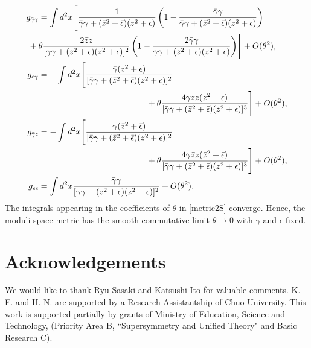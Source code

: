 \documentclass[a4paper,12pt]{article}
\begin{document}
\begin{subequations}\label{metric2S}
\begin{align}
g_{\bar{\gamma}\gamma}&=\int d^2x\Biggl[\frac{1}{\bar{\gamma}\gamma+(\bar{z}^2+\bar{\epsilon})(z^2+\epsilon)}
\left(1-\frac{\bar{\gamma}\gamma}{\bar{\gamma}\gamma+(\bar{z}^2+\bar{\epsilon})(z^2+\epsilon)}\right)\notag\\
{}+{}&\theta\frac{2\bar{z}z}{[\bar{\gamma}\gamma+(\bar{z}^2+\bar{\epsilon})(z^2+\epsilon)]^2}\left(1
-\frac{2\bar{\gamma}\gamma}{\bar{\gamma}\gamma+(\bar{z}^2+\bar{\epsilon})(z^2+\epsilon)}\right)\Biggr]+O(\theta^2),\\
g_{\bar{\epsilon}\gamma}&=-\int d^2x\Biggl[\frac{\bar{\gamma}(z^2+\epsilon)}{[\bar{\gamma}\gamma+(\bar{z}^2
+\bar{\epsilon})(z^2+\epsilon)]^2}\notag\\ &\hspace{4.5cm}
+\theta\frac{4\bar{\gamma}\bar{z}z(z^2+\epsilon)}{[\bar{\gamma}\gamma
+(\bar{z}^2+\bar{\epsilon})(z^2+\epsilon)]^3}\Biggr]+O(\theta^2),\\
g_{\bar{\gamma}\epsilon}&=-\int d^2x\Biggl[\frac{\gamma(\bar{z}^2+\bar{\epsilon})}{[\bar{\gamma}\gamma+(\bar{z}^2
+\bar{\epsilon})(z^2+\epsilon)]^2}\notag\\ &\hspace{4.5cm}
+\theta\frac{4\gamma\bar{z}z(\bar{z}^2+\bar{\epsilon})}{[\bar{\gamma}\gamma
+(\bar{z}^2+\bar{\epsilon})(z^2+\epsilon)]^3}\Biggr]+O(\theta^2),\\
g_{\bar{\epsilon}\epsilon}&=\int d^2x\frac{\bar{\gamma}\gamma}{[\bar{\gamma}\gamma
+(\bar{z}^2+\bar{\epsilon})(z^2+\epsilon)]^2}+O(\theta^2).
\end{align}
\end{subequations}
The integrals appearing in the coefficients of $\theta$ in \eqref{metric2S} converge.
Hence, the moduli space metric has the smooth commutative limit $\theta\rightarrow 0$ with $\gamma$ and $\epsilon$ fixed.




\section*{Acknowledgements}
We would like to thank Ryu Sasaki and Katsushi Ito 
for valuable comments. 
K. F. and H. N. are supported by a Research 
Assistantship of Chuo University. This work is supported 
partially by grants of Ministry of Education, 
Science and Technology, (Priority Area B, ``Supersymmetry and 
Unified Theory" and Basic Research C). 
\end{document}
